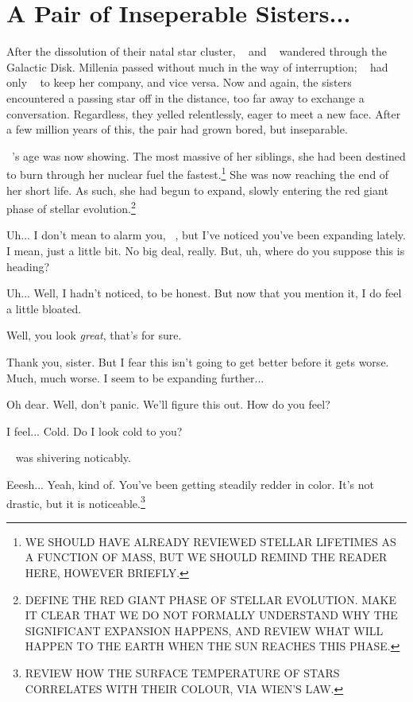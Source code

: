 \documentclass[main.tex]{subfiles}
\begin{document}
\chapter{A Pair of Inseperable Sisters...}

\newpara \nar After the dissolution of their natal star cluster, \rmmaia~ and \rmmerope~ wandered through the Galactic Disk.  Millenia passed without much in the way of interruption; \rmmaia~ had only \rmmerope~ to keep her company, and vice versa.  Now and again, the sisters encountered a passing star off in the distance, too far away to exchange a conversation.  Regardless, they yelled relentlessly, eager to meet a new face.  After a few million years of this, the pair had grown bored, but inseparable.

\newpara \nar \rmmerope~'s age was now showing.  The most massive of her siblings, she had been destined to burn through her nuclear fuel the fastest.\footnote{WE SHOULD HAVE ALREADY REVIEWED STELLAR LIFETIMES AS A FUNCTION OF MASS, BUT WE SHOULD REMIND THE READER HERE, HOWEVER BRIEFLY.}  She was now reaching the end of her short life.  As such, she had begun to expand, slowly entering the red giant phase of stellar evolution.\footnote{DEFINE THE RED GIANT PHASE OF STELLAR EVOLUTION.  MAKE IT CLEAR THAT WE DO NOT FORMALLY UNDERSTAND WHY THE SIGNIFICANT EXPANSION HAPPENS, AND REVIEW WHAT WILL HAPPEN TO THE EARTH WHEN THE SUN REACHES THIS PHASE.}  

\newpara \Maia Uh... I don't mean to alarm you, \rmmerope~, but I've noticed you've been expanding lately.  I mean, just a little bit.  No big deal, really.  But, uh, where do you suppose this is heading?

\newpara \Merope Uh... Well, I hadn't noticed, to be honest.  But now that you mention it, I do feel a little bloated.  

\newpara \Maia Well, you look \textit{great}, that's for sure.

\newpara \Merope Thank you, sister.  But I fear this isn't going to get better before it gets worse.  Much, much worse.  I seem to be expanding further...

\newpara \Maia Oh dear.  Well, don't panic.  We'll figure this out.  How do you feel?

\newpara \Merope I feel... Cold.  Do I look cold to you?

\newpara \nar \rmmerope~ was shivering noticably.

\newpara \Maia Eeesh... Yeah, kind of.  You've been getting steadily redder in color.  It's not drastic, but it is noticeable.\footnote{REVIEW HOW THE SURFACE TEMPERATURE OF STARS CORRELATES WITH THEIR COLOUR, VIA WIEN'S LAW.}
\end{document}
